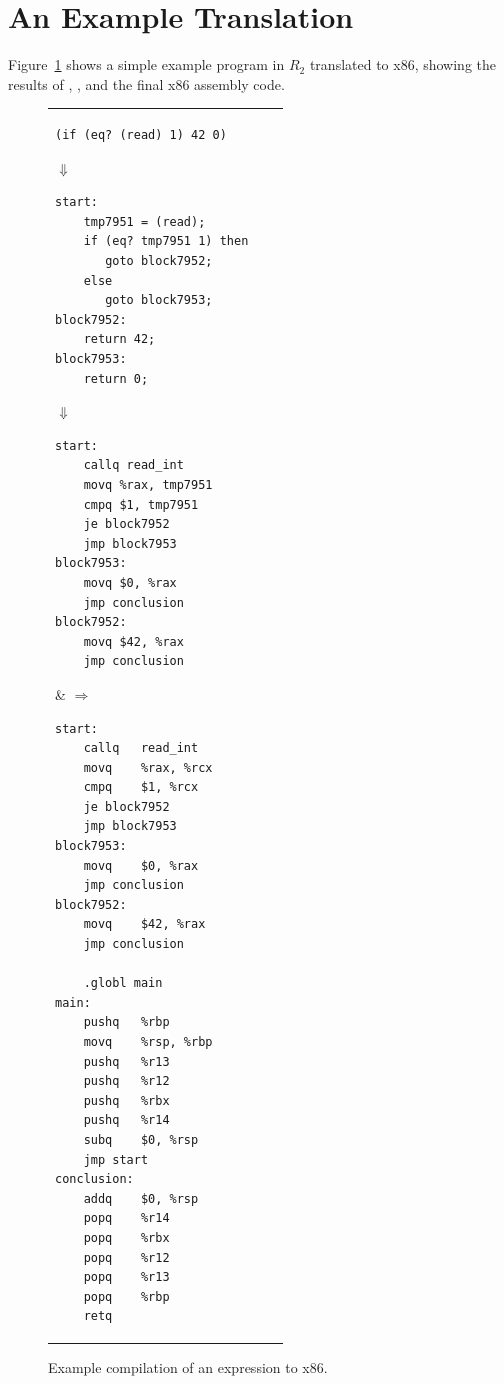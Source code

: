 \documentclass[11pt]{book}
\begin{document}
\section{An Example Translation}

Figure~\ref{fig:if-example-x86} shows a simple example program in
$R_2$ translated to x86, showing the results of
, , and the final
x86 assembly code.

\begin{figure}[tbp]
\begin{tabular}{lll}
\begin{minipage}{0.5\textwidth}
\begin{lstlisting}
(if (eq? (read) 1) 42 0)
\end{lstlisting}
$\Downarrow$
\begin{lstlisting}
start:
    tmp7951 = (read);
    if (eq? tmp7951 1) then
       goto block7952;
    else
       goto block7953;
block7952:
    return 42;
block7953:
    return 0;
\end{lstlisting}
$\Downarrow$
\begin{lstlisting}
start:
    callq read_int
    movq %rax, tmp7951
    cmpq $1, tmp7951
    je block7952
    jmp block7953
block7953:
    movq $0, %rax
    jmp conclusion
block7952:
    movq $42, %rax
    jmp conclusion
\end{lstlisting}
\end{minipage}
&
$\Rightarrow\qquad$
\begin{minipage}{0.4\textwidth}
\begin{lstlisting}
start:
	callq	read_int
	movq	%rax, %rcx
	cmpq	$1, %rcx
	je block7952
	jmp block7953
block7953:
	movq	$0, %rax
	jmp conclusion
block7952:
	movq	$42, %rax
	jmp conclusion

	.globl main
main:
	pushq	%rbp
	movq	%rsp, %rbp
	pushq	%r13
	pushq	%r12
	pushq	%rbx
	pushq	%r14
	subq	$0, %rsp
	jmp start
conclusion:
	addq	$0, %rsp
	popq	%r14
	popq	%rbx
	popq	%r12
	popq	%r13
	popq	%rbp
	retq
\end{lstlisting}
\end{minipage}
\end{tabular}
\caption{Example compilation of an  expression to x86.}
\label{fig:if-example-x86}
\end{figure}
\end{document}
